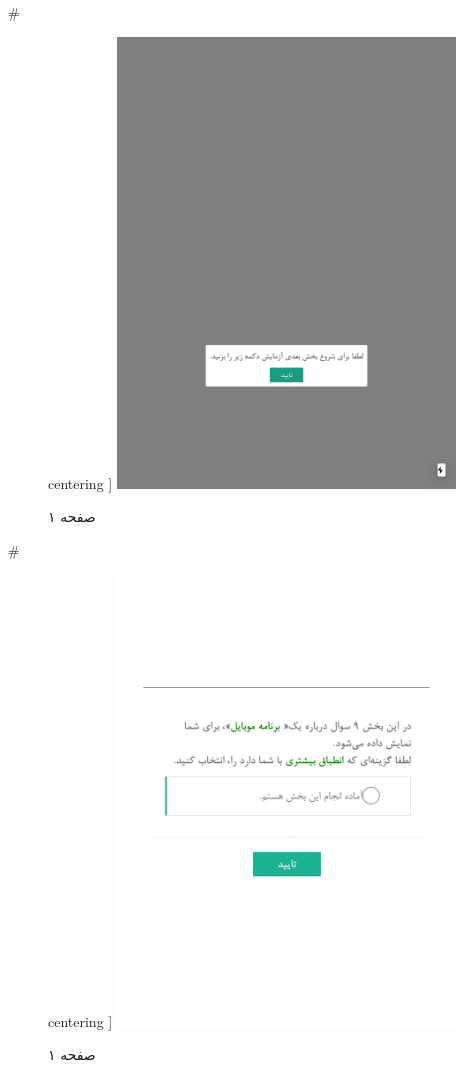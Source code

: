 { 
 # 
\begin{figure}[htpb]
centering ]
\includegraphics[width=0.8\textwidth]{./img/Task48.png/}
\caption{صفحه ۱}
\label{fig:Task1}
\end{figure}
 
 
 # 
\begin{figure}[htpb]
centering ]
\includegraphics[width=0.8\textwidth]{./img/Task49.png/}
\caption{صفحه ۱}
\label{fig:Task1}
\end{figure}
 
}
